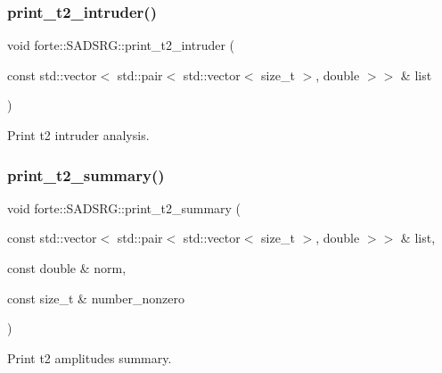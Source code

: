 \subsubsection{\texorpdfstring{print\+\_\+t2\+\_\+intruder()}{print\_t2\_intruder()}}
{\footnotesize\ttfamily void forte\+::\+S\+A\+D\+S\+R\+G\+::print\+\_\+t2\+\_\+intruder (\begin{DoxyParamCaption}\item[{const std\+::vector$<$ std\+::pair$<$ std\+::vector$<$ size\+\_\+t $>$, double $>$$>$ \&}]{list }\end{DoxyParamCaption})\hspace{0.3cm}{\ttfamily [protected]}}



Print t2 intruder analysis. 

\mbox{\label{classforte_1_1_s_a_d_s_r_g_af8bcf1d27b311ebcc457aca19840242e}} 
\subsubsection{\texorpdfstring{print\+\_\+t2\+\_\+summary()}{print\_t2\_summary()}}
{\footnotesize\ttfamily void forte\+::\+S\+A\+D\+S\+R\+G\+::print\+\_\+t2\+\_\+summary (\begin{DoxyParamCaption}\item[{const std\+::vector$<$ std\+::pair$<$ std\+::vector$<$ size\+\_\+t $>$, double $>$$>$ \&}]{list,  }\item[{const double \&}]{norm,  }\item[{const size\+\_\+t \&}]{number\+\_\+nonzero }\end{DoxyParamCaption})\hspace{0.3cm}{\ttfamily [protected]}}



Print t2 amplitudes summary. 

\mbox{\label{classforte_1_1_s_a_d_s_r_g_aeddbbdbe58f7ed8d6187c87967242ed2}} 
